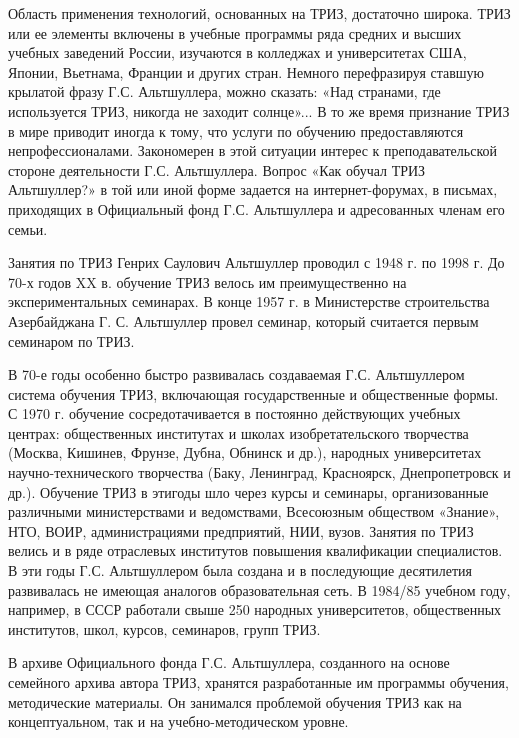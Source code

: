 Область применения технологий, основанных  на ТРИЗ, достаточно широка.
ТРИЗ  или ее  элементы включены  в  учебные программы  ряда средних  и
высших учебных заведений России, изучаются в колледжах и университетах
США, Японии,  Вьетнама, Франции  и других стран.  Немного перефразируя
ставшую крылатой фразу Г.С. Альтшуллера, можно сказать: «Над странами,
где используется  ТРИЗ, никогда  не заходит солнце»...  В то  же время
признание ТРИЗ в  мире приводит иногда к тому, что  услуги по обучению
предоставляются непрофессионалами. Закономерен в этой ситуации интерес
к  преподавательской  стороне  деятельности Г.С.  Альтшуллера.  Вопрос
«Как  обучал  ТРИЗ Альтшуллер?»  в  той  или  иной форме  задается  на
интернет-форумах,  в  письмах,  приходящих  в  Официальный  фонд  Г.С.
Альтшуллера и адресованных членам его семьи.

Занятия по ТРИЗ Генрих Саулович Альтшуллер  проводил с 1948 г. по 1998
г.  До  70-х годов  XX  в.  обучение  ТРИЗ велось  им  преимущественно
на  экспериментальных  семинарах.  В  конце  1957  г.  в  Министерстве
строительства Азербайджана  Г. С.  Альтшуллер провел  семинар, который
считается первым семинаром по ТРИЗ.

В 70-е годы особенно  быстро развивалась создаваемая Г.С. Альтшуллером
система  обучения  ТРИЗ,  включающая  государственные  и  общественные
формы. С  1970 г.  обучение сосредотачивается в  постоянно действующих
учебных  центрах: общественных  институтах и  школах изобретательского
творчества (Москва,  Кишинев, Фрунзе, Дубна, Обнинск  и др.), народных
университетах   научно-технического   творчества   (Баку,   Ленинград,
Красноярск,  Днепропетровск  и  др.).  Обучение  ТРИЗ  в  этигоды  шло
через  курсы и  семинары, организованные  различными министерствами  и
ведомствами, Всесоюзным обществом «Знание», НТО, ВОИР, администрациями
предприятий, НИИ,  вузов. Занятия по  ТРИЗ велись и в  ряде отраслевых
институтов  повышения  квалификации  специалистов.  В  эти  годы  Г.С.
Альтшуллером  была создана  и  в  последующие десятилетия  развивалась
не  имеющая аналогов  образовательная  сеть. В  1984/85 учебном  году,
например,   в  СССР   работали  свыше   250  народных   университетов,
общественных институтов, школ, курсов, семинаров, групп ТРИЗ.

В  архиве Официального  фонда Г.С.  Альтшуллера, созданного  на основе
семейного  архива автора  ТРИЗ,  хранятся  разработанные им  программы
обучения, методические материалы. Он занимался проблемой обучения ТРИЗ
как на концептуальном, так и на учебно-методическом уровне.

